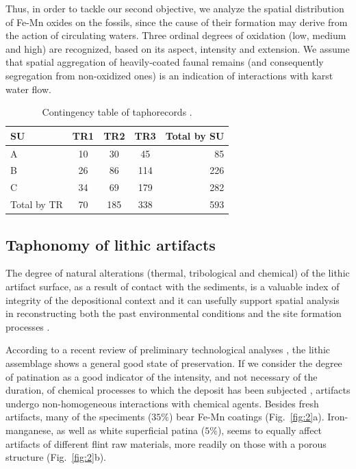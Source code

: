 \documentclass[review,authoryear]{elsarticle} %
\begin{document}
Thus, in order to tackle our second objective, we analyze the spatial distribution of Fe-Mn oxides on the fossils, since the cause of their formation may derive from the action of circulating waters. Three ordinal degrees of oxidation (low, medium and high) are recognized, based on its aspect, intensity and extension. We assume that spatial aggregation of heavily-coated faunal remains (and consequently segregation from non-oxidized ones) is an indication of interactions with karst water flow.

\begin{table}
  \caption{Contingency table of taphorecords \citep[reproduced from][]{Bagnus2011}.}
  \label{tab:1}
  \vspace{0.1in}
  \centering
  \begin{tabular}{l c c c r}
    \hline
    SU & TR1 & TR2 & TR3 & Total by SU \\
    \hline
    A & 10 & 30 & 45 & 85 \\
    B & 26 & 86 & 114 & 226 \\
    C & 34 & 69 & 179 & 282 \\
    Total by TR & 70 & 185 & 338 & 593 \\
    \hline
  \end{tabular}
\end{table}
  
\subsection{Taphonomy of lithic artifacts}

The degree of natural alterations (thermal, tribological and chemical) of the lithic artifact surface, as a result of contact with the sediments, is a valuable index of integrity of the depositional context and it can usefully support spatial analysis in reconstructing both the past environmental conditions and the site formation processes \citep{Burroni2002}.

According to a recent review of preliminary technological analyses \citep{Arzarello2012,Arzarello2014}, the lithic assemblage shows a general good state of preservation. If we consider the degree of patination as a good indicator of the intensity, and not necessary of the duration, of chemical processes to which the deposit has been subjected \citep{Burroni2002}, artifacts undergo non-homogeneous interactions with chemical agents. Besides fresh artifacts, many of the speciments ($35\%$) bear Fe-Mn coatings (Fig.~\ref{fig:2}a). Iron-manganese, as well as white superficial patina ($5\%$), seems to equally affect artifacts of different flint raw materials, more readily on those with a porous structure (Fig.~\ref{fig:2}b).
\end{document}
